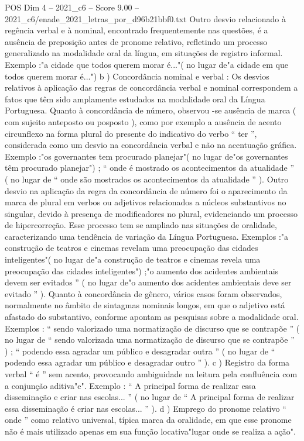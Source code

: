 \begin{textsample}{POS Dim 4 – 2021\_c6 – Score 9.00 – 2021\_c6/enade\_2021\_letras\_por\_d96b21bbf0.txt}
Outro desvio relacionado à regência verbal e à nominal, encontrado frequentemente nas questões, é a ausência de preposição antes de pronome relativo, refletindo um processo generalizado na modalidade oral da língua, em situações de registro informal.
Exemplo :"a cidade que todos querem morar é..."( no lugar de"a cidade em que todos querem morar é...") b ) Concordância nominal e verbal : Os desvios relativos à aplicação das regras de concordância verbal e nominal correspondem a fatos que têm sido amplamente estudados na modalidade oral da Língua Portuguesa.
Quanto à concordância de número, observou -se ausência de marca ( com sujeito anteposto ou posposto ), como por exemplo a ausência de acento circunflexo na forma plural do presente do indicativo do verbo “ ter ”, considerada como um desvio na concordância verbal e não na acentuação gráfica.
Exemplo :"os governantes tem procurado planejar"( no lugar de"os governantes têm procurado planejar") ; “ onde é mostrado os acontecimentos da atualidade ” ( no lugar de “ onde são mostrados os acontecimentos da atualidade ” ).
Outro desvio na aplicação da regra da concordância de número foi o aparecimento da marca de plural em verbos ou adjetivos relacionados a núcleos substantivos no singular, devido à presença de modificadores no plural, evidenciando um processo de hipercorreção.
Esse processo tem se ampliado nas situações de oralidade, caracterizando uma tendência de variação da Língua Portuguesa.
Exemplos :"a construção de teatros e cinemas revelam uma preocupação das cidades inteligentes"( no lugar de"a construção de teatros e cinemas revela uma preocupação das cidades inteligentes") ;"o aumento dos acidentes ambientais devem ser evitados ” ( no lugar de"o aumento dos acidentes ambientais deve ser evitado ” ).
Quanto à concordância de gênero, vários casos foram observados, normalmente no âmbito de sintagmas nominais longos, em que o adjetivo está afastado do substantivo, conforme apontam as pesquisas sobre a modalidade oral.
Exemplos : “ sendo valorizado uma normatização de discurso que se contrapõe ” ( no lugar de “ sendo valorizada uma normatização de discurso que se contrapõe ” ) ; “ podendo essa agradar um público e desagradar outra ” ( no lugar de “ podendo essa agradar um público e desagradar outro ” ). c ) Registro da forma verbal “ é ” sem acento, provocando ambiguidade na leitura pela confluência com a conjunção aditiva"e".
Exemplo : “ A principal forma de realizar essa disseminação e criar nas escolas... ” ( no lugar de “ A principal forma de realizar essa disseminação é criar nas escolas... ” ). d ) Emprego do pronome relativo “ onde ” como relativo universal, típica marca da oralidade, em que esse pronome não é mais utilizado apenas em sua função locativa"lugar onde se realiza a ação".

\end{textsample}
